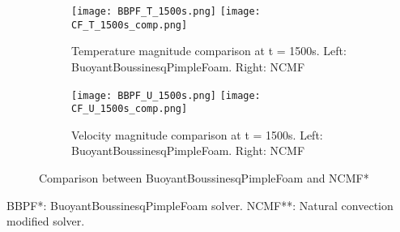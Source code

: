 \begin{figure}[h!]
	\centering
	\begin{subfigure}{\linewidth}
	\texttt{[image: BBPF\_T\_1500s.png]}\hfill
	\texttt{[image: CF\_T\_1500s\_comp.png]}	
	\caption{Temperature magnitude comparison at t = 1500s. Left: BuoyantBoussinesqPimpleFoam. Right: NCMF}
	\label{BBPF_NCMF}
	\end{subfigure}\par\medskip
	\begin{subfigure}{\linewidth}
	\texttt{[image: BBPF\_U\_1500s.png]}\hfill
	\texttt{[image: CF\_U\_1500s\_comp.png]}	
	\caption{Velocity magnitude comparison at t = 1500s. Left: BuoyantBoussinesqPimpleFoam. Right: NCMF}
	\end{subfigure}\par\medskip
	\label{3.5fig}
	\caption{Comparison between BuoyantBoussinesqPimpleFoam and NCMF*}
\end{figure} 
BBPF*: BuoyantBoussinesqPimpleFoam solver.
NCMF**: Natural convection modified solver.


